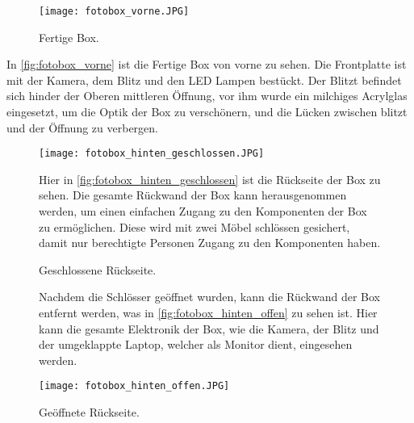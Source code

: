 \newpage

\begin{figure}[H]
    \centering
    \texttt{[image: fotobox\_vorne.JPG]}
    \caption{Fertige Box.}
    \label{fig:fotobox_vorne}
\end{figure}

In \autoref{fig:fotobox_vorne} ist die Fertige Box von vorne zu sehen.
Die Frontplatte ist mit der Kamera, dem Blitz und den LED Lampen bestückt.
Der Blitzt befindet sich hinder der Oberen mittleren Öffnung, vor ihm wurde 
ein milchiges Acrylglas eingesetzt, um die Optik der Box zu verschönern, und 
die Lücken zwischen blitzt und der Öffnung zu verbergen.

\newpage

\begin{figure}[H]
    \centering
    \begin{minipage}{0.5\textwidth}
        \texttt{[image: fotobox\_hinten\_geschlossen.JPG]}
        \caption{Geschlossene Rückseite.}
        \label{fig:fotobox_hinten_geschlossen}
    \end{minipage}
    \hfill
    \begin{minipage}{0.4\textwidth}
        \small
        Hier in \autoref{fig:fotobox_hinten_geschlossen} ist die Rückseite 
        der Box zu sehen. Die gesamte Rückwand der Box kann herausgenommen
        werden, um einen einfachen Zugang zu den Komponenten der Box zu
        ermöglichen. Diese wird mit zwei Möbel schlössen gesichert, damit nur
        berechtigte Personen Zugang zu den Komponenten haben.
    \end{minipage}
\end{figure}

\begin{figure}[H]
    \centering
    \begin{minipage}{0.4\textwidth}
        \small
        Nachdem die Schlösser geöffnet wurden, kann die Rückwand der Box
        entfernt werden, was in \autoref{fig:fotobox_hinten_offen} zu sehen ist.
        Hier kann die gesamte Elektronik der Box, wie die Kamera, der Blitz und 
        der umgeklappte Laptop, welcher als Monitor dient, eingesehen werden.
    \end{minipage}
    \hfill
    \begin{minipage}{0.5\textwidth}
        \texttt{[image: fotobox\_hinten\_offen.JPG]}
        \caption{Geöffnete Rückseite.}
        \label{fig:fotobox_hinten_offen}
    \end{minipage}
\end{figure}

\newpage

